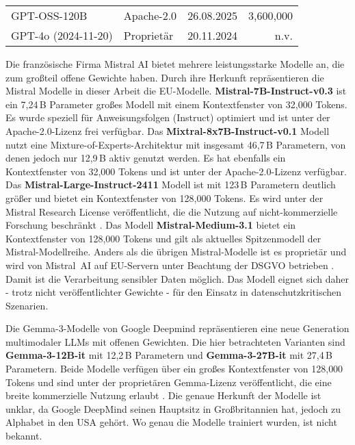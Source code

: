 \begin{sidewaystable}[htbp]
\begin{threeparttable}
\begin{subtable}[t]{0.49\linewidth}
\begin{tabular}{@{}p{6.3cm} l r r@{}}
                GPT-OSS-120B & Apache-2.0 & 26.08.2025 & 3{,}600{,}000 \cite{OpenAI_GPTOSS_ModelCard_2025} \\
                GPT-4o (2024-11-20) & Proprietär & 20.11.2024 & n.v. \cite{openai-hello-gpt-4o} \\
                \bottomrule
            \end{tabular}
        \end{subtable}
    \end{threeparttable}
\end{sidewaystable}

Die französische Firma Mistral AI bietet mehrere leistungsstarke Modelle an, die zum großteil offene Gewichte haben. Durch ihre Herkunft repräsentieren die Mistral Modelle in dieser Arbeit die \ac{EU}-Modelle. \textbf{Mistral-7B-Instruct-v0.3} \cite{HF_Mistral7B_2025} ist ein 7,24\,B Parameter großes Modell mit einem Kontextfenster von 32{,}000 Tokens. Es wurde speziell für Anweisungsfolgen (Instruct) optimiert und ist unter der Apache-2.0-Lizenz frei verfügbar. Das \textbf{Mixtral-8x7B-Instruct-v0.1} Modell \cite{HF_Mixtral8x7B_2025} nutzt eine Mixture-of-Experts-Architektur mit insgesamt 46,7\,B Parametern, von denen jedoch nur 12,9\,B aktiv genutzt werden. Es hat ebenfalls ein Kontextfenster von 32{,}000 Tokens und ist unter der Apache-2.0-Lizenz verfügbar. Das \textbf{Mistral-Large-Instruct-2411} Modell \cite{HF_MistralLargeInstruct_2025} ist mit 123\,B Parametern deutlich größer und bietet ein Kontextfenster von 128{,}000 Tokens. Es wird unter der Mistral Research License veröffentlicht, die die Nutzung auf nicht-kommerzielle Forschung beschränkt \cite{MRL_Research_License}. Das Modell \textbf{Mistral-Medium-3.1} \cite{mistral_models_overview} bietet ein Kontextfenster von 128{,}000 Tokens und gilt als aktuelles Spitzenmodell der Mistral-Modellreihe. Anders als die übrigen Mistral-Modelle ist es proprietär und wird von Mistral~AI auf \ac{EU}-Servern unter Beachtung der \ac{DSGVO} betrieben \cite{mistral-gdpr, mistral-data-storing}. Damit ist die Verarbeitung sensibler Daten möglich. Das Modell eignet sich daher - trotz nicht veröffentlichter Gewichte - für den Einsatz in datenschutzkritischen Szenarien.

Die Gemma-3-Modelle von Google Deepmind repräsentieren eine neue Generation multimodaler \acp{LLM} mit offenen Gewichten. Die hier betrachteten Varianten sind \textbf{Gemma-3-12B-it} \cite{HF_Gemma3_12B_2025} mit 12,2\,B Parametern und \textbf{Gemma-3-27B-it} \cite{HF_Gemma3_27B_2025} mit 27,4\,B Parametern. Beide Modelle verfügen über ein großes Kontextfenster von 128{,}000 Tokens und sind unter der proprietären Gemma-Lizenz veröffentlicht, die eine breite kommerzielle Nutzung erlaubt \cite{Gemma3_License}. Die genaue Herkunft der Modelle ist unklar, da Google DeepMind seinen Hauptsitz in Großbritannien hat, jedoch zu Alphabet in den USA gehört. Wo genau die Modelle trainiert wurden, ist nicht bekannt.


